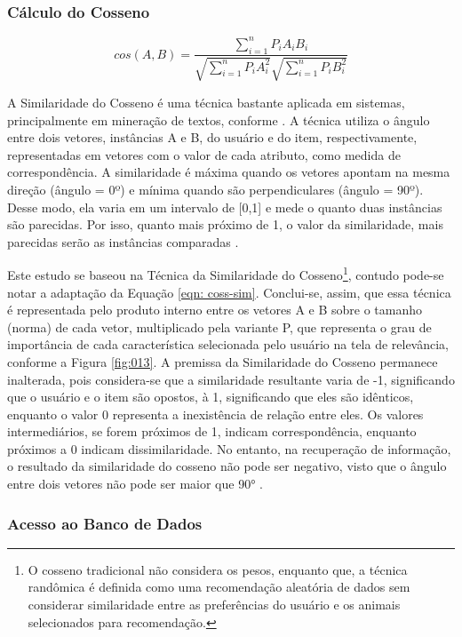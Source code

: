 \documentclass[portuguese]{textolivre}
\begin{document}
\subsubsection {Cálculo do Cosseno}


\begin{equation}
    \label{eqn: coss-sim}
   cos(A,B) =\frac{\sum_{i=1}^{n} P_{i} A_{i} B_{i}}{\sqrt{\sum_{i=1}^{n} P_{i}A_{i}^{2}}  \sqrt{\sum_{i=1}^{n} P_{i}B_{i}^{2}}}
\end{equation}

A Similaridade do Cosseno é uma técnica bastante aplicada em sistemas, principalmente em mineração de textos, conforme \textcite{Campello:2010}. A técnica utiliza o ângulo entre dois vetores, instâncias A e B, do usuário e do item, respectivamente, representadas em vetores com o valor de cada atributo, como medida de correspondência. A similaridade é máxima quando os vetores apontam na mesma direção (ângulo = 0º) e mínima quando são perpendiculares (ângulo = 90º). Desse modo, ela varia em um intervalo de [0,1] e mede o quanto duas instâncias são parecidas. Por isso, quanto mais próximo de 1, o valor da similaridade, mais parecidas serão as instâncias comparadas \cite{Jason:2012}.

Este estudo se baseou na Técnica da Similaridade do Cosseno\footnote{O cosseno tradicional não considera os pesos, enquanto que, a técnica randômica é definida como uma recomendação aleatória de dados sem considerar similaridade entre as preferências do usuário e os animais selecionados para recomendação.}, contudo pode-se notar a adaptação da Equação \eqref{eqn: coss-sim}. Conclui-se, assim, que essa técnica é representada pelo produto interno entre os vetores A e B sobre o tamanho (norma) de cada vetor, multiplicado pela variante P, que representa o grau de importância de cada característica selecionada pelo usuário na tela de relevância, conforme a Figura \ref{fig:013}. A premissa da Similaridade do Cosseno permanece inalterada, pois considera-se que a similaridade resultante varia de -1, significando que o usuário e o item são opostos, à 1, significando que eles são idênticos, enquanto o valor 0 representa a inexistência de relação entre eles. Os valores intermediários, se forem próximos de 1, indicam correspondência, enquanto próximos a 0 indicam dissimilaridade. No entanto, na recuperação de informação, o resultado da similaridade do cosseno não pode ser negativo, visto que o ângulo entre dois vetores não pode ser maior que 90° \cite{Queiroz:2019:DCC}.

\subsubsection {Acesso ao Banco de Dados}
\end{document}
